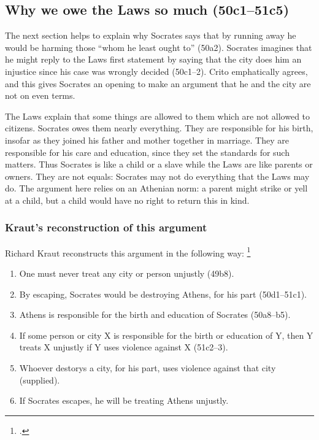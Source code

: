 \documentclass[12pt,letterpaper]{article}
\begin{document}
\subsection*{Why we owe the Laws so much (50c1--51c5)}

The next section helps to explain why Socrates says that by running away he would be harming those ``whom he least ought to'' (50a2).
Socrates imagines that he might reply to the Laws first statement by saying that the city does him an injustice since his case was wrongly decided (50c1--2).
Crito emphatically agrees, and this gives Socrates an opening to make an argument that he and the city are not on even terms.

The Laws explain that some things are allowed to them which are not allowed
to citizens.
Socrates owes them nearly everything.
They are responsible for his birth, insofar as they joined his father and mother together in marriage.
They are responsible for his care and education, since they set the standards for such matters.
Thus Socrates is like a child or a slave while the Laws are like parents or owners.
They are not equals: Socrates may not do everything that the Laws may do.
The argument here relies on an Athenian norm: a parent might strike or yell at a child, but a child would have no right to return this in kind.

\subsubsection*{Kraut's reconstruction of this argument}

Richard Kraut reconstructs this argument in the following way:%
\footcite[][TODO: page reference]{kraut-socrates-state-1984}

\begin{enumerate}

    \item One must never treat any city or person unjustly (49b8).

    \item By escaping, Socrates would be destroying Athens, for his part (50d1--51c1).

    \item Athens is responsible for the birth and education of Socrates (50a8--b5).

    \item If some person or city X is responsible for the birth or education of Y, then Y treats X unjustly if Y uses violence against X (51c2--3).

    \item Whoever destorys a city, for his part, uses violence against that city (supplied).

    \item If Socrates escapes, he will be treating Athens unjustly.

\end{enumerate}
\end{document}
